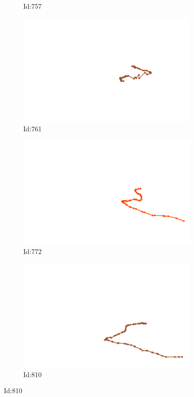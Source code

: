 \documentclass[12pt,twoside]{report}
\begin{document}
\begin{figure}
\begin{subfigure}[b]{0.20\textwidth}
\caption{Id:757}
\end{subfigure}
\begin{subfigure}[b]{0.20\textwidth}
\centering
\includegraphics[width=\textwidth]{../trajectories/761.png}
\caption{Id:761}
\end{subfigure}
\begin{subfigure}[b]{0.20\textwidth}
\centering
\includegraphics[width=\textwidth]{../trajectories/772.png}
\caption{Id:772}
\end{subfigure}
\begin{subfigure}[b]{0.20\textwidth}
\centering
\includegraphics[width=\textwidth]{../trajectories/810.png}
\caption{Id:810}
\end{subfigure}
\end{figure}
\end{document}
